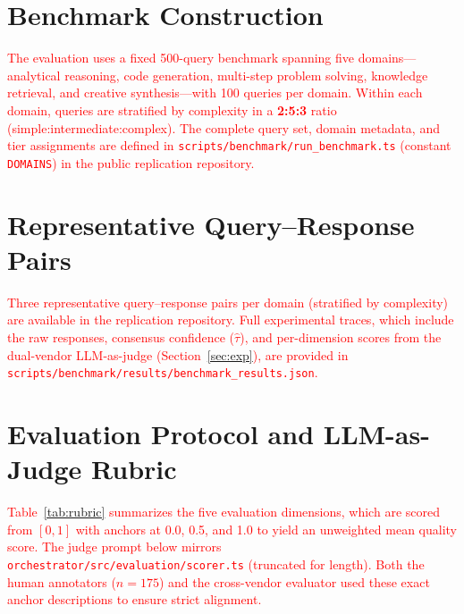 \documentclass{iopjournal}
\newcommand{\rev}[1]{\textcolor{red}{#1}}
\begin{document}
\appendix

\section{Benchmark Construction}
\label{app:benchmark}
\rev{The evaluation uses a fixed 500-query benchmark spanning five domains---analytical reasoning, code generation, multi-step problem solving, knowledge retrieval, and creative synthesis---with 100 queries per domain. Within each domain, queries are stratified by complexity in a \textbf{2:5:3} ratio (simple:intermediate:complex). The complete query set, domain metadata, and tier assignments are defined in \texttt{scripts/benchmark/run\_benchmark.ts} (constant \texttt{DOMAINS}) in the public replication repository.}

\section{Representative Query--Response Pairs}
\label{app:examples}
\rev{Three representative query--response pairs per domain (stratified by complexity) are available in the replication repository. Full experimental traces, which include the raw responses, consensus confidence ($\hat{\tau}$), and per-dimension scores from the dual-vendor LLM-as-judge (Section~\ref{sec:exp}), are provided in \texttt{scripts/benchmark/results/benchmark\_results.json}.}

\section{Evaluation Protocol and LLM-as-Judge Rubric}
\label{app:rubric}

\rev{Table~\ref{tab:rubric} summarizes the five evaluation dimensions, which are scored from $[0,1]$ with anchors at 0.0, 0.5, and 1.0 to yield an unweighted mean quality score. The judge prompt below mirrors \texttt{orchestrator/src/evaluation/scorer.ts} (truncated for length). Both the human annotators ($n=175$) and the cross-vendor evaluator used these exact anchor descriptions to ensure strict alignment.}
\end{document}
